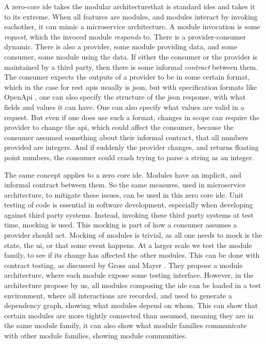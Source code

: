 A zero-core \gls{ide} takes the modular architecturethat is standard \gls{ide}s
and takes it to its extreme. When all features are modules, and modules interact
by invoking eachother, it can mimic a microservice architecture. A module
invocation is some \textit{request}, which the invoced module \textit{responds}
to. There is a provider-consumer dynamic. There is also a provider, some module
providing data, and some consumer, some module using the data. If either the
consumer or the provider is maintained by a third party, then there is some
informal \textit{contract} between them. The consumer expects the outputs of a
provider to be in some certain format, which in the case for \gls{rest}
\gls{api}s usually is \gls{json}, but with specification formats like OpenApi
\cite{openApi}, one can also specify the structure of the \gls{json} response,
with what fields and values it can have. One can also specify what values are
valid in a request. But even if one does use such a format, changes in scope can
require the provider to change the \gls{api}, which could affect the consumer,
because the consumer assumed something about their informal contract, that all
numbers provided are integers. And if suddenly the provider changes, and returns
floating point numbers, the consumer could crash trying to parse a string as an 
integer.

The same concept applies to a zero core \gls{ide}. Modules have an implicit, and
informal contract between them. So the same measures, used in microservice
architecture, to mitigate these issues, can be used in this zero core \gls{ide}.
Unit testing of code is essential in software development, especially when
developing against third party systems. Instead, invoking these third party
systems at test time, mocking is used. This mocking is part of how a consumer
assumes a provider should act. Mocking of modules is trivial, as all one needs
to mock is the state, the \gls{ui}, or that some event happens. At a larger
scale we test the module family, to see if its change has affected the other
modules. This can be done with contract testing, as discussed by Gross and Mayer
\cite{GROSS200322}. They propose a module architecture, where each module expose
some testing interface. However, in the architecture propose by us, all modules
composing the \gls{ide} can be loaded in a test environment, where all
interactions are recorded, and used to generate a dependency graph, showing what
modules depend on whom. This can show that certain modules are more tightly
connected than assumed, meaning they are in the same module family, it can also
show what module families communicate with other module families, showing module
communities.

